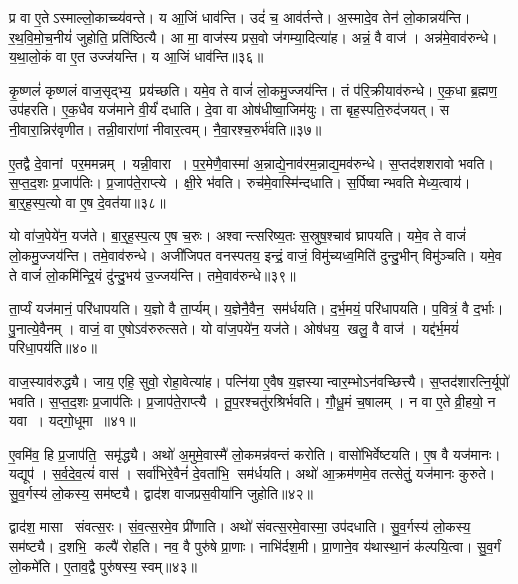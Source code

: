 प्र वा ए॒तेऽस्माल्लो॒काच्च्य॑वन्ते।
य आ॒जिं धाव॑न्ति।
उदं॑ च॒ आव॑र्तन्ते।
अ॒स्मादे॒व तेन॑ लो॒कान्नय॑न्ति।
र॒थ॒वि॒मो॒च॒नीयं॑ जुहोति॒ प्रति॑ष्ठित्यै।
आ मा॒ वाज॑स्य प्रस॒वो ज॑गम्या॒दित्या॑ह।
अन्नं॒ वै वाज॑।
अन्न॑मे॒वाव॑रुन्धे।
य॒था॒लो॒कं वा ए॒त उज्ज॑यन्ति।
य आ॒जिं धाव॑न्ति॥३६॥

कृ॒ष्णलं॑ कृष्णलं वाज॒सृद्भ्य॒ प्रय॑च्छति।
यमे॒व ते वाजं॑ लो॒कमु॒ज्जय॑न्ति।
तं प॑रि॒क्रीयाव॑रुन्धे।
ए॒क॒धा ब्र॒ह्मण॒ उप॑हरति।
ए॒क॒धैव यज॑माने वी॒र्यं॑ दधाति।
दे॒वा वा ओष॑धीष्वा॒जिम॑युः।
ता बृह॒स्पति॒रुद॑जयत्।
स नी॒वारा॒न्निर॑वृणीत।
तन्नी॒वारा॑णां नीवार॒त्वम्।
नै॒वा॒रश्च॒रुर्भ॑वति॥३७॥

ए॒तद्वै दे॒वानां पर॒ममन्नम्।
यन्नी॒वारा।
प॒र॒मेणै॒वास्मा॑ अ॒न्नाद्ये॒नाव॑रम॒न्नाद्य॒मव॑रुन्धे।
स॒प्तद॑शशरावो भवति।
स॒प्त॒द॒शः प्र॒जाप॑तिः।
प्र॒जाप॑ते॒राप्त्ये।
क्षी॒रे भ॑वति।
रुच॑मे॒वास्मि॑न्दधाति।
स॒र्पिष्वान्भवति मेध्य॒त्वाय॑।
बा॒र्॒ह॒स्प॒त्यो वा ए॒ष दे॒वत॑या॥३८॥

यो वा॑ज॒पेये॑न॒ यज॑ते।
बा॒र्॒ह॒स्प॒त्य ए॒ष च॒रुः।
अश्वान्त्सरिष्य॒तः स॒स्रुष॒श्चाव॑ घ्रापयति।
यमे॒व ते वाजं॑ लो॒कमु॒ज्जय॑न्ति।
तमे॒वाव॑रुन्धे।
अजी॑जिपत वनस्पतय॒ इन्द्रं॒ वाजं॒ विमु॑च्यध्व॒मिति॑ दुन्दु॒भीन् विमु॑ञ्चति।
यमे॒व ते वाजं॑ लो॒कमि॑न्द्रि॒यं दु॑न्दु॒भय॑ उ॒ज्जय॑न्ति।
तमे॒वाव॑रुन्धे॥३९॥

ता॒र्प्यं यज॑मानं॒ परि॑धापयति।
य॒ज्ञो वै ता॒र्प्यम्।
य॒ज्ञेनै॒वैन॒ सम॑र्धयति।
द॒र्भ॒मयं॒ परि॑धापयति।
प॒वित्रं॒ वै द॒र्भाः।
पु॒नात्ये॒वैनम्।
वाजं॒ वा ए॒षोऽव॑रुरुत्सते।
यो वा॑ज॒पये॑न॒ यज॑ते।
ओष॑धय॒ खलु॒ वै वाज॑।
यद्द॑र्भ॒मयं॑ परिधा॒पय॑ति॥४०॥

वाज॒स्याव॑रुद्ध्यै।
जाय॒ एहि॒ सुवो॒ रोहा॒वेत्या॑ह।
पत्नि॑या ए॒वैष य॒ज्ञस्यान्वार॒म्भोऽन॑वच्छित्त्यै।
स॒प्तद॑शारत्नि॒र्यूपो॑ भवति।
स॒प्त॒द॒शः प्र॒जाप॑तिः।
प्र॒जाप॑ते॒राप्त्यै।
तू॒प॒रश्चतु॑रश्रिर्भवति।
गौ॒धू॒मं च॒षालम्।
न वा ए॒ते व्री॒हयो॒ न यवा।
यद्गो॒धूमा॥४१॥

ए॒वमि॑व॒ हि प्र॒जाप॑ति॒ समृ॑द्ध्यै।
अथो॑ अ॒मुमे॒वास्मै॑ लो॒कमन्न॑वन्तं करोति।
वासो॑भिर्वेष्टयति।
ए॒ष वै यज॑मानः।
यद्यूप॑।
स॒र्व॒दे॒व॒त्यं॑ वास॑।
सर्वा॑भिरे॒वैनं॑ दे॒वता॑भि॒ सम॑र्धयति।
अथो॑ आ॒क्रम॑णमे॒व तत्सेतुं॒ यज॑मानः कुरुते।
सु॒व॒र्गस्य॑ लो॒कस्य॒ सम॑ष्ट्यै।
द्वाद॑श वाजप्रस॒वीया॑नि जुहोति॥४२॥

द्वाद॑श॒ मासा संवत्स॒रः।
सं॒व॒त्स॒रमे॒व प्री॑णाति।
अथो॑ संवत्स॒रमे॒वास्मा॒ उप॑दधाति।
सु॒व॒र्गस्य॑ लो॒कस्य॒ सम॑ष्ट्यै।
द॒शभि॒ कल्पै॑ रोहति।
नव॒ वै पुरु॑षे प्रा॒णाः।
नाभि॑र्दश॒मी।
प्रा॒णाने॒व य॑थास्था॒नं क॑ल्पयि॒त्वा।
सु॒व॒र्गं लो॒कमे॑ति।
ए॒ताव॒द्वै पुरु॑षस्य॒ स्वम्॥४३॥

